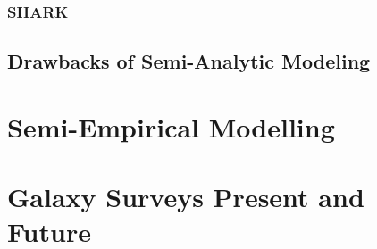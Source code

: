 \subsubsection{SHARK}


\subsection{Drawbacks of Semi-Analytic Modeling}



\section{Semi-Empirical Modelling}
\label{sec:SEM}



\section{Galaxy Surveys Present and Future}
\label{sec:Surveys}





